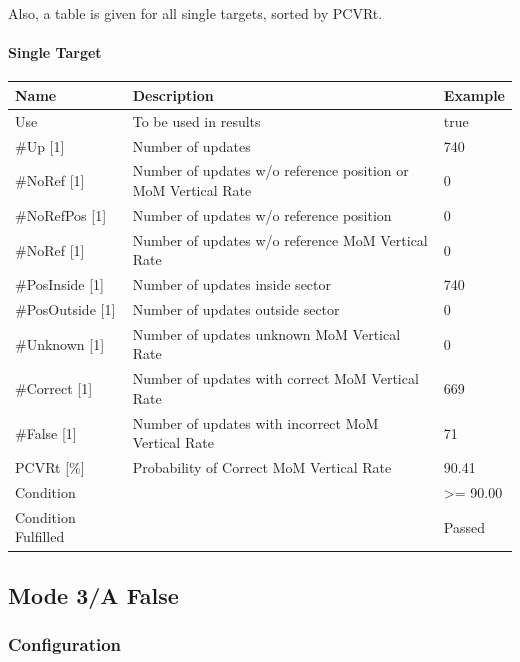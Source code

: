 Also, a table is given for all single targets, sorted by PCVRt.

\paragraph{Single Target}

\begin{center}
 \begin{table}[H]
  \begin{tabularx}{\textwidth}{ | l | X |  l | }
    \hline
    \textbf{Name} & \textbf{Description} & \textbf{Example} \\ \hline
    Use & To be used in results & true \\ \hline
    \#Up [1] & Number of updates & 740 \\ \hline
    \#NoRef [1] & Number of updates w/o reference position or MoM Vertical Rate & 0 \\ \hline
    \#NoRefPos [1] & Number of updates w/o reference position  & 0 \\ \hline
    \#NoRef [1] & Number of updates w/o reference MoM Vertical Rate & 0 \\ \hline
    \#PosInside [1] & Number of updates inside sector & 740 \\ \hline
    \#PosOutside [1] & Number of updates outside sector & 0 \\ \hline
    \#Unknown [1] & Number of updates unknown MoM Vertical Rate & 0 \\ \hline
    \#Correct [1] & Number of updates with correct MoM Vertical Rate & 669 \\ \hline
    \#False [1] & Number of updates with incorrect MoM Vertical Rate & 71 \\ \hline
    PCVRt [\%] & Probability of Correct MoM Vertical Rate & 90.41 \\ \hline
    Condition &  & >= 90.00 \\ \hline
    Condition Fulfilled &  & Passed \\ \hline
\end{tabularx}
\end{table}
\end{center}


\subsection{Mode 3/A False}
\label{sec:eval_req_m3a_false} 

\subsubsection{Configuration}

